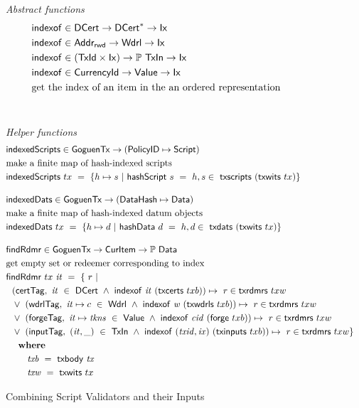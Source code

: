 \begin{figure}[htb]
  \emph{Abstract functions}
  \begin{align*}
    &\fun{indexof} \in \DCert \to \seqof{\DCert} \to \Ix\\
    &\fun{indexof} \in \AddrRWD \to \Wdrl \to \Ix\\
    &\fun{indexof} \in (\TxId \times \Ix) \to \powerset{\TxIn} \to \Ix\\
    &\fun{indexof} \in \CurrencyId \to \Value \to \Ix\\
    & \text{get the index of an item in the an ordered representation} \\
    \nextdef
  \end{align*}
  \emph{Helper functions}
  \begin{align*}
    &\fun{indexedScripts} \in \GoguenTx \to (\PolicyID \mapsto \Script) \\
    & \text{make a finite map of hash-indexed scripts} \\
    &\fun{indexedScripts}~{tx} ~=~ \{ h \mapsto s ~\vert~ \fun{hashScript}~{s}~=~h,
     s\in~\fun{txscripts}~(\fun{txwits}~{tx})\}
    \nextdef
    &\fun{indexedDats} \in \GoguenTx \to (\DataHash \mapsto \Data)\\
    & \text{make a finite map of hash-indexed datum objects} \\
    &\fun{indexedDats}~{tx} ~=~ \{ h \mapsto d ~\vert~ \fun{hashData}~{d}~=~h,
     d\in~\fun{txdats}~(\fun{txwits}~{tx})\}
    &\nextdef
    &\fun{findRdmr} \in \GoguenTx \to \CurItem \to \powerset{\Data}\\
    & \text{get empty set or redeemer corresponding to index} \\
    & \fun{findRdmr}~{tx}~\var{it} ~=~ \{~ r ~\vert~ \\
    &~~(\mathsf{certTag},~\var{it}~\in~\DCert~\wedge~ \fun{indexof}~\var{it}~(\fun{txcerts}~{txb})) \mapsto ~r \in \fun{txrdmrs}~{txw} \\
    &~~\vee~ (\mathsf{wdrlTag},~\var{it}\mapsto c~\in~\Wdrl~\wedge~\fun{indexof}~\var{w}~(\fun{txwdrls}~{txb}))
      \mapsto ~r \in \fun{txrdmrs}~{txw} \\
    &~~\vee~(\mathsf{forgeTag},~\var{it}\mapsto \var{tkns}~\in~\Value~\wedge~\fun{indexof}~\var{cid}~(\fun{forge}~{txb}))  \mapsto ~r
      \in \fun{txrdmrs}~{txw} \\
    &~~\vee~(\mathsf{inputTag},~\var{(it,\_)}~\in~\TxIn~\wedge~\fun{indexof}~\var{(txid,ix)}~(\fun{txinputs}~{txb})) \mapsto ~r
      \in \fun{txrdmrs}~{txw} \} \\
      & ~~\where \\
      & ~~~~~~~ \var{txb}~=~\txbody{tx} \\
      & ~~~~~~~ \var{txw}~=~\fun{txwits}~{tx}
  \end{align*}
  \caption{Combining Script Validators and their Inputs}
  \label{fig:functions:script1}
\end{figure}

